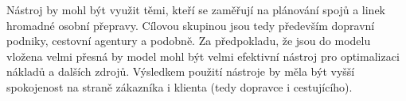\documentclass[a4paper]{article}
\begin{document}
			Nástroj by mohl být využit těmi, kteří se zaměřují na plánování spojů a linek hromadné osobní přepravy. Cílovou skupinou jsou tedy především dopravní podniky, cestovní agentury a podobně. Za předpokladu, že jsou do modelu vložena velmi přesná by model mohl být velmi efektivní nástroj pro optimalizaci nákladů a dalších zdrojů. Výsledkem použití nástroje by měla být vyšší spokojenost na straně zákazníka i klienta (tedy dopravce i cestujícího).
            


    \newpage

    \renewcommand{\refname}{Použitá literatura}
    
    
\end{document}
